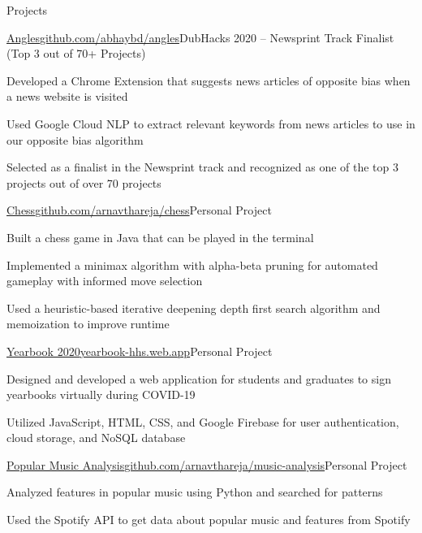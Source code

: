 \documentclass{resume} %
\begin{document}

\begin{rSection}{Projects}

\begin{project}{\href{https://github.com/abhaybd/angles}{Angles}}{\href{https://github.com/abhaybd/angles}{github.com/abhaybd/angles}}{DubHacks 2020 – Newsprint Track Finalist (Top 3 out of 70+ Projects)}
\item Developed a Chrome Extension that suggests news articles of opposite bias when a news website is visited
\item Used Google Cloud NLP to extract relevant keywords from news articles to use in our opposite bias algorithm
\item Selected as a finalist in the Newsprint track and recognized as one of the top 3 projects out of over 70 projects
\end{project}

\begin{project}{\href{https://github.com/arnavthareja/chess}{Chess}}{\href{https://github.com/arnavthareja/chess}{github.com/arnavthareja/chess}}{Personal Project}
\item Built a chess game in Java that can be played in the terminal
\item Implemented a minimax algorithm with alpha-beta pruning for automated gameplay with informed move selection
\item Used a heuristic-based iterative deepening depth first search algorithm and memoization to improve runtime
\end{project}

\begin{project}{\href{https://yearbook-hhs.web.app/}{Yearbook 2020}}{\href{https://yearbook-hhs.web.app/}{yearbook-hhs.web.app}}{Personal Project}
\item Designed and developed a web application for students and graduates to sign yearbooks virtually during COVID-19
\item Utilized JavaScript, HTML, CSS, and Google Firebase for user authentication, cloud storage, and NoSQL database
\end{project}

\begin{project}{\href{https://github.com/arnavthareja/music-analysis}{Popular Music Analysis}}{\href{https://github.com/arnavthareja/music-analysis}{github.com/arnavthareja/music-analysis}}{Personal Project}
\item Analyzed features in popular music using Python and searched for patterns
\item Used the Spotify API to get data about popular music and features from Spotify
\end{project}

\end{rSection}
\end{document}

